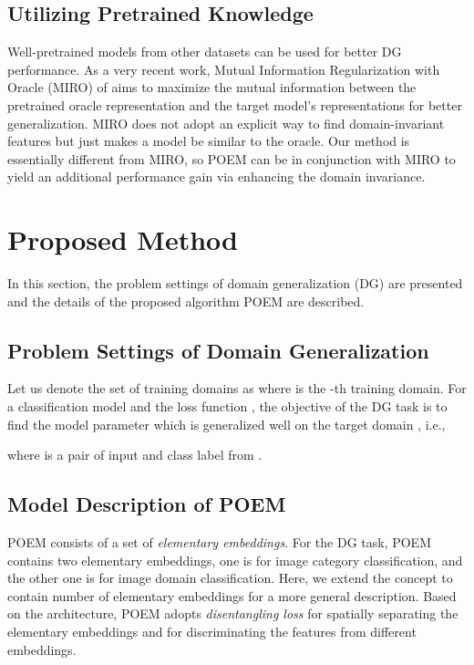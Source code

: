 \documentclass[letterpaper]{article} \usepackage{aaai23}  \usepackage{times}  \usepackage{helvet}  \usepackage{courier}  \usepackage[hyphens]{url}  \usepackage{graphicx} \urlstyle{rm} \def\UrlFont{\rm}  \usepackage{natbib}  \usepackage{caption} \frenchspacing  \setlength{\pdfpagewidth}{8.5in}  \setlength{\pdfpageheight}{11in}  \usepackage[labelsep=period]{caption}
\begin{document}
\subsection{Utilizing Pretrained Knowledge}
Well-pretrained models from other datasets can be used for better DG performance.
As a very recent work, Mutual Information Regularization with Oracle (MIRO) of \cite{MIRO} aims to maximize the mutual information between the pretrained oracle representation and the target model's representations for better generalization.
MIRO does not adopt an explicit way to find domain-invariant features but just makes a model be similar to the oracle.
Our method is essentially different from MIRO, so POEM can be in conjunction with MIRO to yield an additional performance gain via enhancing the domain invariance.











\section{Proposed Method}
In this section, the problem settings of domain generalization (DG) are presented and the details of the proposed algorithm POEM are described.

\subsection{Problem Settings of Domain Generalization}
Let us denote the set of training domains as  where  is the -th training domain. 
For a classification model  and the loss function , the objective of the DG task is to find the model parameter  which is generalized well on the target domain , i.e.,

where  is a pair of input and class label from .

\subsection{Model Description of POEM}
POEM consists of a set of \textit{elementary embeddings}. For the DG task, POEM contains two elementary embeddings, one is for image category classification, and the other one is for image domain classification. Here, we extend the concept to contain  number of elementary embeddings for a more general description. 
Based on the architecture, POEM adopts \textit{disentangling loss} for spatially separating the elementary embeddings and  for discriminating the features from different embeddings.
\end{document}

